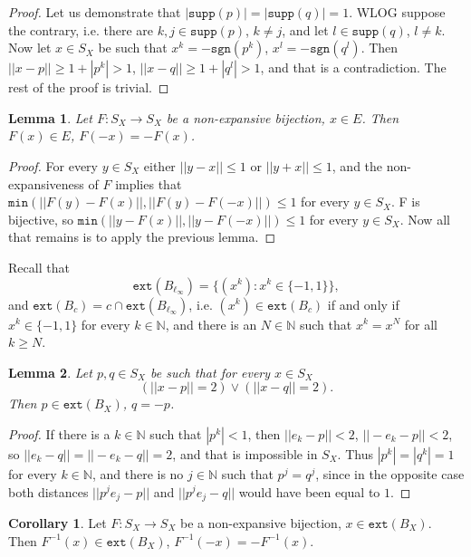 \documentclass[reqno]{amsart}
\theoremstyle{plain}
\newtheorem{lemma}{Lemma}[section]
\theoremstyle{remark}
\theoremstyle{definition}
\newtheorem{corollary}{Corollary}[section]
\newcommand{\N}{\mathbb N}
\begin{document}
\begin{proof}
    Let us demonstrate that $|\mathtt{supp}(p)|=|\mathtt{supp}(q)|=1$. WLOG suppose the contrary, i.e. there are $k,j \in \mathtt{supp}(p)$, $k\neq j$, and let $l \in \mathtt{supp}(q)$, $l\neq k$. Now let $x \in S_X$ be such that $x^k=-\mathtt{sgn}(p^k)$, $x^l=-\mathtt{sgn}(q^l)$. Then $||x-p||\geq 1+|p^k|>1$, $||x-q||\geq 1+|q^l|>1$, and that is a contradiction. The rest of the proof is trivial.
\end{proof}


\begin{lemma}\label{linf2}
    Let $F: S_X\rightarrow S_X$ be a non-expansive bijection, $x \in E$. Then $F(x)\in E$, $F(-x)=-F(x)$.
\end{lemma}

\begin{proof}
    For every $y \in S_X$ either $||y-x||\leq 1$ or $||y+x|| \leq 1$, and the non-expansiveness of $F$ implies that $\mathtt{min}(||F(y)-F(x)||,||F(y)-F(-x)||)\leq 1$ for every $y \in S_X$. F is bijective, so $\mathtt{min}(||y-F(x)||,||y-F(-x)||)\leq 1$ for every $y \in S_X$. Now all that remains is to apply the previous lemma.
\end{proof}

Recall that \[\mathtt{ext}(B_{\ell_\infty})=\{(x^k):x^k \in \{-1,1\}\},\]
and $\mathtt{ext}(B_c)=c \cap \mathtt{ext}(B_{\ell_\infty})$, i.e. $(x^k)\in\mathtt{ext}(B_c)$ if and only if $x^k\in\{-1,1\}$ for every $k\in \N$, and there is an $N \in \N$ such that $x^k=x^N$ for all $k \geq N$.

\begin{lemma}\label{linf3}
    Let $p,q \in S_X$ be such that for every $x \in S_X$
    \begin{equation*}
        (||x-p||=2)\vee(||x-q||=2).
    \end{equation*}
    Then $p \in \mathtt{ext}(B_X)$, $q=-p$.
\end{lemma}

\begin{proof}
    If there is a $k \in \N$ such that $|p^k|<1$, then $||e_k-p||<2$, $||-e_k-p||<2$, so $||e_k-q||=||-e_k-q||=2$, and that is impossible in $S_X$. Thus $|p^k|=|q^k|=1$ for every $k \in \N$, and there is no $j \in \N$ such that $p^j=q^j$, since in the opposite case both distances $||p^je_j-p||$ and $||p^je_j-q||$ would have been equal to $1$.
\end{proof}

\begin{corollary}
Let $F:S_X\rightarrow S_X$ be a non-expansive bijection, $x \in \mathtt{ext}(B_X)$.\\ Then $F^{-1}(x) \in \mathtt{ext}(B_X)$, $F^{-1}(-x)=-F^{-1}(x)$.
\end{corollary}
\end{document}
